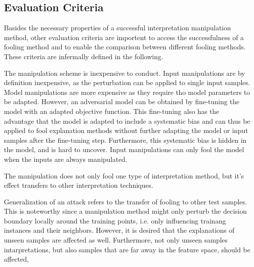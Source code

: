 
\subsection{Evaluation Criteria}
\label{subsec:eval_criteria_manipulations}
Basides the necessary properties of a successful interpretation manipulation method, other evaluation criteria are importent to access the successfulness of a fooling method and to enable the comparison between different fooling methods. These criteria are infermally defined in the following.

 The manipulation scheme is inexpensive to conduct. Input manipulations are by definition inexpensive, as the perturbation can be applied to single input samples. Model manipulations are more expensive as they require tho model parameters to be adapted. However, an adversarial model can be obtained by fine-tuning the model with an adapted objective function. This fine-tuning also has the advantage that the model is adapted to include a systematic bias and can thus be applied to fool explanation methods without further adapting the model or input samples after the fine-tuning step. Furthermore, this systematic bias is hidden in the model, and is hard to uncover. Input manipulations can only fool the model when the inputs are always manipulated. 

 The manipulation does not only fool one type of interpretation method, but it's effect transfers to other interpretation techniques. 

 Generalization of an attack refers to the transfer of fooling to other test samples. This is noteworthy since a manipulation method might only perturb the decision boundary locally around the training points, i.e. only influencing trainang instances and their neighbors. However, it is desired that the explanations of unseen samples are affected as well. Furthermore, not only unseen samples intarpretations, but also samples that are far away in the feature space, should be affected, 

